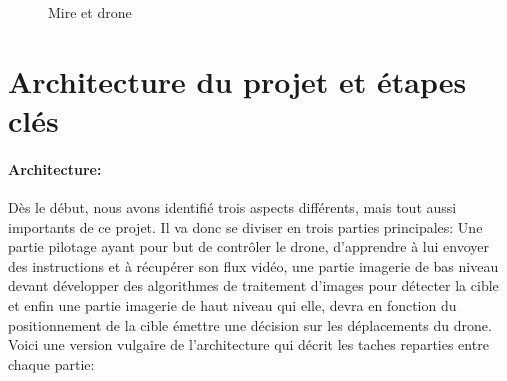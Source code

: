 \documentclass[12pt]{article}
\begin{document}
\begin{figure}[H]
    \centering
    \qquad
    \caption{Mire et drone}
    \label{fig:example}
\end{figure}




\section{Architecture du projet et étapes clés}

\paragraph*{Architecture:}
Dès le début, nous avons identifié trois aspects différents, mais tout aussi importants de ce projet. Il va donc se diviser en trois parties principales:
Une partie pilotage ayant pour but de contrôler le drone, d'apprendre à lui envoyer des instructions et à récupérer son flux vidéo, une partie imagerie de bas niveau devant développer des algorithmes de traitement d'images pour détecter la cible et enfin une partie imagerie de haut niveau qui elle, devra en fonction du positionnement de la cible émettre une décision sur les déplacements du drone.\\
Voici une version vulgaire de l'architecture qui décrit les taches reparties entre chaque partie:
\end{document}
